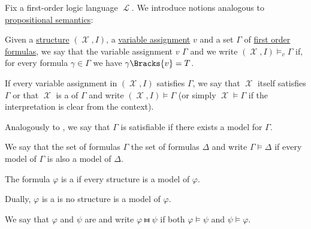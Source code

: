 \begin{definition}\label{def:first_order_semantics}\mcite\cite[208]{OpenLogic20201202}
  Fix a first-order logic language \( \mscrL \). We introduce notions analogous to \hyperref[def:propositional_semantics]{propositional semantics}:
  \begin{defenum}
     Given a \hyperref[def:first_order_structure]{structure} \( (\mscrX, I) \), a \hyperref[def:first_order_valuation/variable_assignment]{variable assignment} \( v \) and a set \( \Gamma \) of \hyperref[def:first_order_syntax/formula]{first order formulas}, we say that the variable assignment \( v \)  \( \Gamma \) and we write \( (\mscrX, I) \vDash_v \Gamma \) if, for every formula \( \gamma \in \Gamma \) we have \( \gamma\Bracks{v} = T \).

    If every variable assignment in \( (\mscrX, I) \) satisfies \( \Gamma \), we say that \( \mscrX \) itself satisfies \( \Gamma \) or that \( \mscrX \) is a  of \( \Gamma \) and write \( (\mscrX, I) \vDash \Gamma \) (or simply \( \mscrX \vDash \Gamma \) if the interpretation is clear from the context).

    Analogously to , we say that \( \Gamma \) is satisfiable if there exists a model for \( \Gamma \).

     We say that the set of formulas \( \Gamma \)  the set of formulas \( \Delta \) and write \( \Gamma \vDash \Delta \) if every model of \( \Gamma \) is also a model of \( \Delta \).

     The formula \( \varphi \) is a  if every structure is a model of \( \varphi \).

     Dually, \( \varphi \) is a  is no structure is a model of \( \varphi \).

     We say that \( \varphi \) and \( \psi \) are  and write \( \varphi \gleichstark \psi \) if both \( \varphi \vDash \psi \) and \( \psi \vDash \varphi \).
  \end{defenum}
\end{definition}

